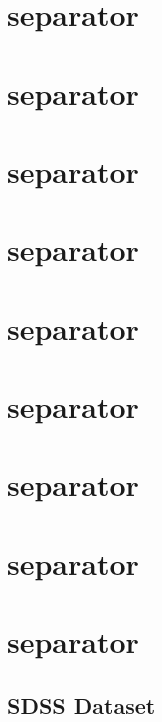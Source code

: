 \documentclass[11pt]{article}
\begin{document}
\section{separator}\label{separator-1}

\section{separator}\label{separator-2}

\section{separator}\label{separator-3}

\section{separator}\label{separator-4}

\section{separator}\label{separator-5}

\section{separator}\label{separator-6}

\section{separator}\label{separator-7}

\section{separator}\label{separator-8}

\section{separator}\label{separator-9}

    \subsection{SDSS Dataset}\label{sdss-dataset}
\end{document}
